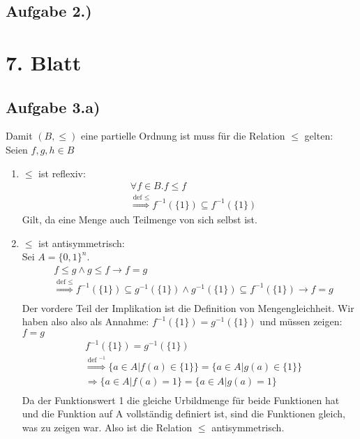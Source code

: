 \documentclass[10pt,a4paper,german,landscape,fleqn]{article} \usepackage[utf8]{inputenc} %
\begin{document}
\subsection*{Aufgabe 2.)}

\section*{7. Blatt } %

\subsection*{Aufgabe 3.a)}
Damit $(B,\le)$ eine partielle Ordnung ist muss für die Relation $\le$ gelten:\\
Seien $f,g,h \in B$ \\
\begin{enumerate}
  \item $\le$ ist reflexiv: \\
    \begin{align}
      &\forall f \in B. f \le f\\
      &{\stackrel{\text{def $\le$}}{\Rightarrow}} f^{-1}(\{1\}) \subseteq f^{-1}(\{1\})
    \end{align}
    Gilt, da eine Menge auch Teilmenge von sich selbst ist.
  \item $\le$ ist antisymmetrisch: \\
    Sei $A=\{0,1\}^n$.
    \begin{align}
      &f \le g \wedge g \le f \rightarrow f = g \\
      &{\stackrel{\text{def $\le$}}{\Rightarrow}} f^{-1}(\{1\}) \subseteq g^{-1}(\{1\}) \wedge g^{-1}(\{1\}) \subseteq f^{-1}(\{1\}) \rightarrow f = g \\
    \end{align}
      Der vordere Teil der Implikation ist die Definition von Mengengleichheit. Wir haben also also als Annahme: $f^{-1}(\{1\}) = g^{-1}(\{1\})$ und müssen zeigen: $f=g$
    \begin{align}
      &f^{-1}(\{1\}) = g^{-1}(\{1\}) \\
      &{\stackrel{\text{def $^{-1}$}}{\Rightarrow}} \{a \in A | f(a) \in \{1\}\} = \{a \in A | g(a) \in \{1\}\} \\
      &\Rightarrow \{a \in A | f(a) = 1\} = \{a \in A | g(a) = 1\} \\
    \end{align}
    Da der Funktionswert 1 die gleiche Urbildmenge für beide Funktionen hat und die Funktion auf A vollständig definiert ist, sind die Funktionen gleich, was zu zeigen war. Also ist die Relation $\le$ antisymmetrisch.

\end{enumerate}
\end{document}
